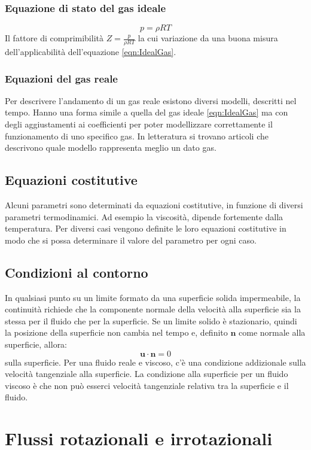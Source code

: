 \subsection{Equazione di stato del gas ideale}
\begin{equation}
p = \rho R T
\label{eqn:IdealGas}
\end{equation}
Il fattore di comprimibilità $Z = \frac{p}{\rho R T}$ la cui variazione da una buona misura dell'applicabilità dell'equazione \eqref{eqn:IdealGas}.

\subsection{Equazioni del gas reale}
Per descrivere l'andamento di un gas reale esistono diversi modelli, descritti nel tempo.
Hanno una forma simile a quella del gas ideale \eqref{eqn:IdealGas} ma con degli aggiustamenti ai coefficienti per poter modellizzare correttamente il funzionamento di uno specifico gas.
In letteratura si trovano articoli che descrivono quale modello rappresenta meglio un dato gas.

\section{Equazioni costitutive}
Alcuni parametri sono determinati da equazioni costitutive, in funzione di diversi parametri termodinamici.
Ad esempio la viscosità, dipende fortemente dalla temperatura.
Per diversi casi vengono definite le loro equazioni costitutive in modo che si possa determinare il valore del parametro per ogni caso.

\section{Condizioni al contorno}
In qualsiasi punto su un limite formato da una superficie solida impermeabile, la continuità richiede che la componente normale della velocità alla superficie sia la stessa per il fluido che per la superficie.
Se un limite solido è stazionario, quindi la posizione della superficie non cambia nel tempo e, definito $\mathbf{n}$ come normale alla superficie, allora:
\begin{equation}
\mathbf{u} \cdot \mathbf{n} = 0 
\end{equation}
sulla superficie.
Per una fluido reale e viscoso, c'è una condizione addizionale sulla velocità tangenziale alla superficie. La condizione alla superficie per un fluido viscoso è che non può esserci velocità tangenziale relativa tra la superficie e il fluido.

\chapter{Flussi rotazionali e irrotazionali}\label{chp:RotIrrotFlow}

